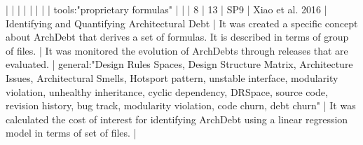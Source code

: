 |    |            |      |                                                                      |                                                                                                                                                                          |                                                                                                                                                                                                                                                            |                                                                                                                                                                                                                                                                      |  tools:"proprietary formulas"                                                                                                                                                                                                                                                                            |                                                                                                                                                                                                                                                                                                                                                                                                                                                                                              |
|  8 |         13 | SP9  | Xiao et al. 2016                                                     | Identifying and Quantifying Architectural Debt                                                                                                                           | It was created a specific concept about ArchDebt that derives a set of formulas. It is described in terms of group of files.                                                                                                                             | It was monitored the evolution of ArchDebts through releases that are evaluated.                                                                                                                                                                                   | general:"Design Rules Spaces, Design Structure Matrix, Architecture Issues, Architectural Smells, Hotsport pattern, unstable interface, modularity violation, unhealthy inheritance, cyclic dependency, DRSpace, source code, revision history, bug track, modularity violation, code churn, debt churn" | It was calculated the cost of interest for identifying ArchDebt using a linear regression model in terms of set of files.                                                                                                                                                                                                                                                                                                                                                                |
